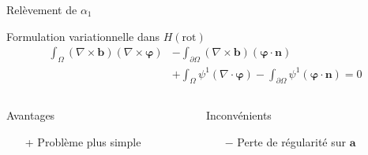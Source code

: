 \documentclass{beamer}
\newcommand{\rot}{{\nabla\times}}
\renewcommand{\div}{{\nabla\cdot}}
\begin{document}
\begin{frame}{Relèvement de $\alpha_1$}
\begin{block}{Formulation variationnelle dans $ H(\mathrm{rot})$}
\begin{align*}
\int_\Omega (\rot \mathbf{b})(\rot\bm{\varphi}) &- \int_{\partial\Omega} (\rot \mathbf{b})(\bm{\varphi}\cdot \mathbf{n}) \\
&+\int_\Omega \psi^1(\div\bm{\varphi}) - \int_{\partial\Omega} \psi^1(\bm{\varphi}\cdot \mathbf{n}) = 0
\end{align*}
\end{block}
\begin{columns}[t]
\begin{column}{5cm}
\begin{exampleblock}{Avantages}
\begin{itemize}
\item[+] Problème plus simple
\end{itemize}
\end{exampleblock}
\end{column}
\begin{column}{5cm}
\begin{alertblock}{Inconvénients}
\begin{itemize}
\item[$-$] Perte de régularité sur $\mathbf{a}$
\end{itemize}
\end{alertblock}
\end{column}
\end{columns}
\end{frame}
\end{document}

